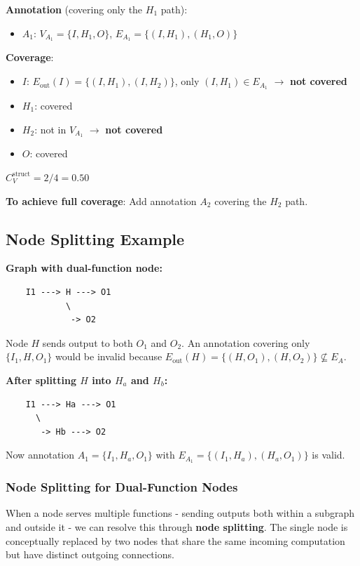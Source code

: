 \documentclass{article}
\begin{document}
\textbf{Annotation} (covering only the $H_1$ path):
\begin{itemize}
    \item $A_1$: $V_{A_1} = \{I, H_1, O\}$, $E_{A_1} = \{(I, H_1), (H_1, O)\}$
\end{itemize}

\textbf{Coverage}:
\begin{itemize}
    \item $I$: $E_{\text{out}}(I) = \{(I, H_1), (I, H_2)\}$, only $(I, H_1) \in E_{A_1}$ $\rightarrow$ \textbf{not covered}
    \item $H_1$: covered \checkmark
    \item $H_2$: not in $V_{A_1}$ $\rightarrow$ \textbf{not covered}
    \item $O$: covered \checkmark
\end{itemize}

$C_V^{\text{struct}} = 2/4 = 0.50$

\textbf{To achieve full coverage}: Add annotation $A_2$ covering the $H_2$ path.

\subsection{Node Splitting Example}

\textbf{Graph with dual-function node:}
\begin{verbatim}
    I1 ---> H ---> O1
            \
             -> O2
\end{verbatim}


Node $H$ sends output to both $O_1$ and $O_2$. An annotation covering only $\{I_1, H, O_1\}$ would be invalid because $E_{\text{out}}(H) = \{(H, O_1), (H, O_2)\} \not\subseteq E_A$.

\textbf{After splitting $H$ into $H_a$ and $H_b$:}
\begin{verbatim}
    I1 ---> Ha ---> O1
      \
       -> Hb ---> O2
\end{verbatim}

Now annotation $A_1 = \{I_1, H_a, O_1\}$ with $E_{A_1} = \{(I_1, H_a), (H_a, O_1)\}$ is valid.

\subsubsection{Node Splitting for Dual-Function Nodes}

When a node serves multiple functions - sending outputs both within a subgraph and outside it - we can resolve this through \textbf{node splitting}. The single node is conceptually replaced by two nodes that share the same incoming computation but have distinct outgoing connections.
\end{document}
